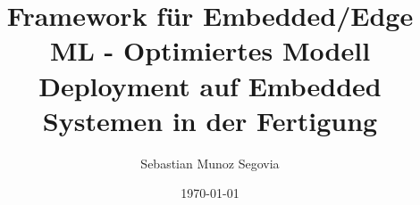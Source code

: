 \documentclass[a4paper]{report}
\begin{document}
\title{Framework für Embedded/Edge ML - Optimiertes Modell Deployment auf Embedded Systemen in der Fertigung}
\author{Sebastian Munoz Segovia}
\date{\today}
\maketitle

\tableofcontents
\listoffigures
\listoftables










\appendix




\end{document}
